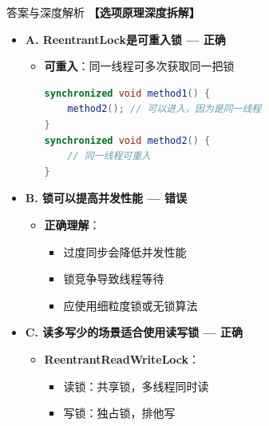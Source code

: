 \documentclass[12pt, a4paper]{ctexart}
\begin{document}
\begin{enumerate}[label=\textbf{\arabic*.}]
\begin{bluebox}{答案与深度解析}
		      \textbf{【选项原理深度拆解】}
					  \begin{itemize}[label={}, leftmargin=*, nosep]

		      \item \textbf{A. ReentrantLock是可重入锁 — 正确}
		      \begin{itemize}[label={}, leftmargin=*, nosep]
			      \item \textbf{可重入}：同一线程可多次获取同一把锁
			            \begin{lstlisting}[language=Java]
synchronized void method1() {
    method2(); // 可以进入，因为是同一线程
}
synchronized void method2() {
    // 同一线程可重入
}
      \end{lstlisting}
		      \end{itemize}

		      \item \textbf{B. 锁可以提高并发性能 — 错误}
		      \begin{itemize}[label={}, leftmargin=*, nosep]
			      \item \textbf{正确理解}：
			            \begin{itemize}[label={}, nosep]
				            \item 过度同步会降低并发性能
				            \item 锁竞争导致线程等待
				            \item 应使用细粒度锁或无锁算法
			            \end{itemize}
		      \end{itemize}

		      \item \textbf{C. 读多写少的场景适合使用读写锁 — 正确}
		      \begin{itemize}[label={}, leftmargin=*, nosep]
			      \item \textbf{ReentrantReadWriteLock}：
			            \begin{itemize}[label={}, nosep]
				            \item 读锁：共享锁，多线程同时读
				            \item 写锁：独占锁，排他写
			            \end{itemize}
		      \end{itemize}


\end{itemize}
\end{bluebox}
\end{enumerate}
\end{document}
